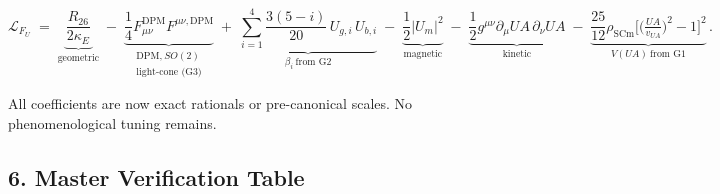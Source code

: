 \documentclass[
]{article}
\begin{document}
\[ \mathcal{L}_{F_U} \;=\;
   \underbrace{\frac{R_{26}}{2\kappa_E}}_{\text{geometric}}
   \;-\; \underbrace{\frac{1}{4} F_{\mu\nu}^{\mathrm{DPM}} F^{\mu\nu,\mathrm{DPM}}}_{\substack{\text{DPM,}\ SO(2)\\ \text{light-cone (G3)}}}
   \;+\; \underbrace{\sum_{i=1}^{4}\frac{3(5-i)}{20}\,U_{g,i}\,U_{b,i}}_{\beta_i\ \text{from G2}}
   \;-\; \underbrace{\frac{1}{2}|U_m|^2}_{\text{magnetic}}
   \;-\; \underbrace{\frac{1}{2}g^{\mu\nu}\partial_\mu UA\,\partial_\nu UA}_{\text{kinetic}}
   \;-\; \underbrace{\frac{25}{12}\rho_{\mathrm{SCm}}\!\Big[\!\big(\tfrac{UA}{v_{UA}}\big)^{\!2}-1\Big]^{2}}_{V(UA)\ \text{from G1}}\,. \]

All coefficients are now exact rationals or pre-canonical scales. No
phenomenological tuning remains.

\subsection{6. Master Verification
Table}\label{master-verification-table}
\end{document}
